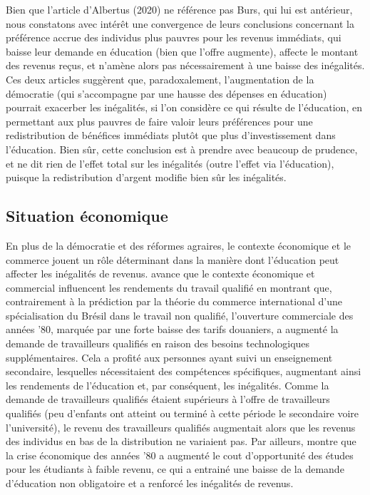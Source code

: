 \documentclass[pagesize, twoside=off, bibliography=totoc, DIV=calc, fontsize=12pt, a4paper, french]{scrartcl}
\begin{document}
Bien que l’article d’Albertus (2020) ne référence pas Burs, qui lui est antérieur, nous constatons avec intérêt une convergence de leurs conclusions concernant la préférence accrue des individus plus pauvres pour les revenus immédiats, qui baisse leur demande en éducation (bien que l’offre augmente), affecte le montant des revenus reçus, et n’amène alors pas nécessairement à une baisse des inégalités. Ces deux articles suggèrent que, paradoxalement, l’augmentation de la démocratie (qui s’accompagne par une hausse des dépenses en éducation) pourrait exacerber les inégalités, si l’on considère ce qui résulte de l’éducation, en permettant aux plus pauvres de faire valoir leurs préférences pour une redistribution de bénéfices immédiats plutôt que plus d’investissement dans l’éducation. Bien sûr, cette conclusion est à prendre avec beaucoup de prudence, et ne dit rien de l’effet total sur les inégalités (outre l’effet via l’éducation), puisque la redistribution d’argent modifie bien sûr les inégalités.

\subsection{Situation économique}

En plus de la démocratie et des réformes agraires, le contexte économique et le commerce jouent un rôle déterminant dans la manière dont l’éducation peut affecter les inégalités de revenus.  avance que le contexte économique et commercial influencent les rendements du travail qualifié en montrant que, contrairement à la prédiction par la théorie du commerce international d’une spécialisation du Brésil dans le travail non qualifié, l’ouverture commerciale des années ’80, marquée par une forte baisse des tarifs douaniers, a augmenté la demande de travailleurs qualifiés en raison des besoins technologiques supplémentaires. Cela a profité aux personnes ayant suivi un enseignement secondaire, lesquelles nécessitaient des compétences spécifiques, augmentant ainsi les rendements de l’éducation et, par conséquent, les inégalités. Comme la demande de travailleurs qualifiés étaient supérieurs à l’offre de travailleurs qualifiés (peu d’enfants ont atteint ou terminé à cette période le secondaire voire l’université), le revenu des travailleurs qualifiés augmentait alors que les revenus des individus en bas de la distribution ne variaient pas. Par ailleurs, \citet{urbina} montre que la crise économique des années ’80 a augmenté le cout d’opportunité des études pour les étudiants à faible revenu, ce qui a entrainé une baisse de la demande d’éducation non obligatoire et a renforcé les inégalités de revenus.
\end{document}
